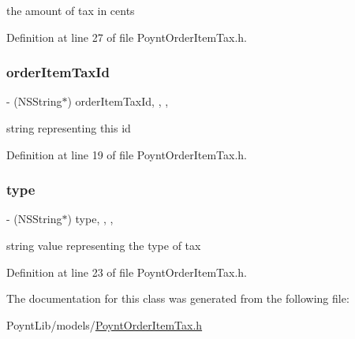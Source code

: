 the amount of tax in cents 



Definition at line 27 of file Poynt\+Order\+Item\+Tax.\+h.

\hypertarget{interface_poynt_order_item_tax_a342356fc9b7bcfd0250df7e71bc2360e}{}\label{interface_poynt_order_item_tax_a342356fc9b7bcfd0250df7e71bc2360e} 
\subsubsection{\texorpdfstring{order\+Item\+Tax\+Id}{orderItemTaxId}}
{\footnotesize\ttfamily -\/ (N\+S\+String$\ast$) order\+Item\+Tax\+Id\hspace{0.3cm}{\ttfamily [read]}, {\ttfamily [write]}, {\ttfamily [nonatomic]}, {\ttfamily [copy]}}



string representing this id 



Definition at line 19 of file Poynt\+Order\+Item\+Tax.\+h.

\hypertarget{interface_poynt_order_item_tax_abff6a04d71c2bba87e646615388a1f5c}{}\label{interface_poynt_order_item_tax_abff6a04d71c2bba87e646615388a1f5c} 
\subsubsection{\texorpdfstring{type}{type}}
{\footnotesize\ttfamily -\/ (N\+S\+String$\ast$) type\hspace{0.3cm}{\ttfamily [read]}, {\ttfamily [write]}, {\ttfamily [nonatomic]}, {\ttfamily [copy]}}



string value representing the type of tax 



Definition at line 23 of file Poynt\+Order\+Item\+Tax.\+h.



The documentation for this class was generated from the following file\+:\begin{DoxyCompactItemize}
\item 
Poynt\+Lib/models/\hyperlink{_poynt_order_item_tax_8h}{Poynt\+Order\+Item\+Tax.\+h}\end{DoxyCompactItemize}
